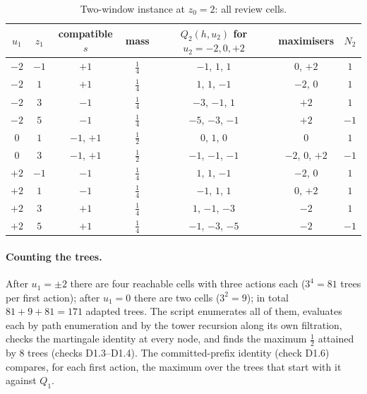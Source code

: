 \documentclass[11pt,a4paper]{article}
\theoremstyle{plain}
\theoremstyle{definition}
\theoremstyle{remark}
\newcommand{\tfr}[2]{\tfrac{#1}{#2}}
\begin{document}
\begin{table}[H]
\centering\small
\caption{Two-window instance at $z_0=2$: all review cells.}
\label{tab:tree}
\begin{tabular}{ccccccc}
\toprule
$u_1$ & $z_1$ & compatible $s$ & mass & $Q_2(h,u_2)$ for $u_2=-2,0,+2$ & maximisers & $N_2$\\
\midrule
$-2$ & $-1$ & $+1$ & $\tfrac{1}{4}$ & $-1$, $1$, $1$ & $0$, $+2$ & $1$\\
$-2$ & $1$ & $+1$ & $\tfrac{1}{4}$ & $1$, $1$, $-1$ & $-2$, $0$ & $1$\\
$-2$ & $3$ & $-1$ & $\tfrac{1}{4}$ & $-3$, $-1$, $1$ & $+2$ & $1$\\
$-2$ & $5$ & $-1$ & $\tfrac{1}{4}$ & $-5$, $-3$, $-1$ & $+2$ & $-1$\\
$0$ & $1$ & $-1$, $+1$ & $\tfrac{1}{2}$ & $0$, $1$, $0$ & $0$ & $1$\\
$0$ & $3$ & $-1$, $+1$ & $\tfrac{1}{2}$ & $-1$, $-1$, $-1$ & $-2$, $0$, $+2$ & $-1$\\
$+2$ & $-1$ & $-1$ & $\tfrac{1}{4}$ & $1$, $1$, $-1$ & $-2$, $0$ & $1$\\
$+2$ & $1$ & $-1$ & $\tfrac{1}{4}$ & $-1$, $1$, $1$ & $0$, $+2$ & $1$\\
$+2$ & $3$ & $+1$ & $\tfrac{1}{4}$ & $1$, $-1$, $-3$ & $-2$ & $1$\\
$+2$ & $5$ & $+1$ & $\tfrac{1}{4}$ & $-1$, $-3$, $-5$ & $-2$ & $-1$\\
\bottomrule
\end{tabular}
\end{table}

\paragraph{Counting the trees.} After $u_1=\pm2$ there are four reachable cells with three actions each ($3^4=81$ trees per first action); after $u_1=0$ there are two cells ($3^2=9$); in total $81+9+81=171$ adapted trees. The script enumerates all of them, evaluates each by path enumeration and by the tower recursion along its own filtration, checks the martingale identity at every node, and finds the maximum $\tfr12$ attained by $8$ trees (checks D1.3--D1.4). The committed-prefix identity (check D1.6) compares, for each first action, the maximum over the trees that start with it against $Q_1$.
\end{document}
